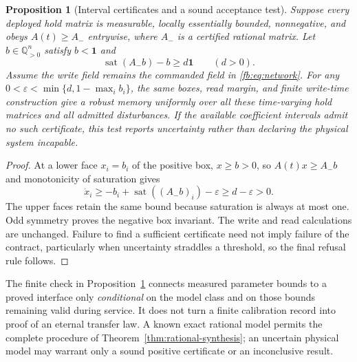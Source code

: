\documentclass[11pt]{article}
\newtheorem{proposition}[theorem]{Proposition}
\theoremstyle{definition}
\theoremstyle{remark}
\newcommand{\sat}{\operatorname{sat}}
\begin{document}
\begin{proposition}[Interval certificates and a sound acceptance test]
\label{prop:interval-warrant}
Suppose every deployed hold matrix is measurable, locally essentially
bounded, nonnegative, and obeys
$A(t)\geq A_-$ entrywise, where $A_-$ is a certified rational matrix.
Let $b\in\mathbb Q_{>0}^n$ satisfy $b<\boldsymbol1$ and
\[
       \sat(A_-b)-b\geq d\boldsymbol1\qquad(d>0).
\]
Assume the write field remains the commanded field in
\eqref{fb:eq:network}. For any
$0<\varepsilon<\min\{d,1-\max_i b_i\}$, the same boxes, read margin,
and finite write-time construction give a robust memory uniformly over
all these time-varying hold matrices and all admitted disturbances.
If the available coefficient intervals admit no such certificate, this
test reports uncertainty rather than declaring the physical system
incapable.
\end{proposition}
\begin{proof}
At a lower face $x_i=b_i$ of the positive box, $x\geq b>0$, so
$A(t)x\geq A_-b$ and monotonicity of saturation gives
\[
        \dot x_i\geq-b_i+\sat((A_-b)_i)-\varepsilon
                    \geq d-\varepsilon>0.
\]
The upper faces retain the same bound because saturation is always at
most one. Odd symmetry proves the negative box invariant. The write and
read calculations are unchanged. Failure to find a sufficient certificate
need not imply failure of the contract, particularly when uncertainty
straddles a threshold, so the final refusal rule follows.
\end{proof}

The finite check in Proposition~\ref{prop:interval-warrant} connects
measured parameter bounds to a proved interface only \emph{conditional}
on the model class and on those bounds remaining valid during service.
It does not turn a finite calibration record into proof of an eternal
transfer law. A known exact rational model permits the complete procedure
of Theorem~\ref{thm:rational-synthesis}; an uncertain physical model may
warrant only a sound positive certificate or an inconclusive result.
\end{document}
